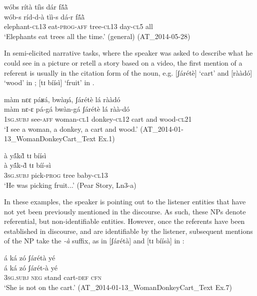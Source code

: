 \documentclass[output=paper]{langsci/langscibook}
\begin{document}
\ea\label{ex:teo:27}
wóbs rítà tíìs dár f\'{ã}\`{ã}\\
\gll wób-s ríd-d-à tìì-s dá-r f\'{ã}\`{ã}\\
elephant-\textsc{cl13} eat-\textsc{prog-aff} tree-\textsc{cl13} day-\textsc{cl5} all\\
\glt ‘Elephants eat trees all the time.’ (general) (AT\_2014-05-28)
\z

In semi-elicited narrative tasks, where the speaker was asked to describe what he could see in a picture or retell a story based on a video, the first mention of a referent is usually in the citation form of the noun, e.g. [ʃárétè] ‘cart’ and [rààdó] ‘wood’ in ; [tɪ bíísì] ‘fruit’ in .

\ea\label{ex:teo:28}
màm nɛɛ páʁá, bwàŋá, ʃárétè lá rààdó\\
\gll màm nɛ-ɛ pá-gá bwàn-gá ʃárétè lá ràà-dó\\
1\textsc{sg.subj} see-\textsc{aff} woman-\textsc{cl1} donkey-\textsc{cl12} cart and wood-\textsc{cl21}\\
\glt ‘I see a woman, a donkey, a cart and wood.’ (AT\_2014-01-13\_WomanDonkeyCart\_Text Ex.1)
\z

\ea\label{ex:teo:29}
à y\'{ã}k\`{d} tɪ bíísì\\
\gll à y\'{ã}k-\`{d}{\rmfnm} tɪ bíí-sì\\
3\textsc{sg.subj} pick-\textsc{prog} tree baby-\textsc{cl13}\\
\glt ‘He was picking fruit...’ (Pear Story, Ln3-a)
\z


In these examples, the speaker is pointing out to the listener entities that have not yet been previously mentioned in the discourse. As such, these NPs denote referential, but non-identifiable entities. However, once the referents have been established in discourse, and are identifiable by the listener, subsequent mentions of the NP take the \textit{-à} suffix, as in [ʃárétà]  and [tɪ bíísà] in :

\ea\label{ex:teo:30}

á ká zó ʃárétà yé\\
\gll á ká zó ʃárét-à yé\\
 3\textsc{sg}\textsc{.subj} \textsc{neg} stand cart-\textsc{def}{\rmfnm}  \textsc{cfn}\\
\glt ‘She is not on the cart.’ (AT\_2014-01-13\_WomanDonkeyCart\_Text Ex.7)
\z
{}
\end{document}
